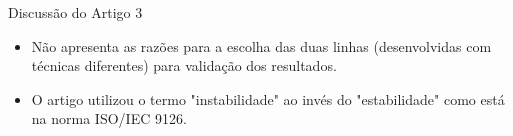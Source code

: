 \begin{frame}{Discussão do Artigo 3}
    \begin{itemize}
      \item Não apresenta as razões para a escolha das  \alert{duas linhas} (desenvolvidas com técnicas diferentes) para \alert{validação dos resultados}.
      \item O artigo utilizou o termo \alert{"instabilidade"} ao invés do \alert{"estabilidade"} como está na norma \alert{ISO/IEC 9126}.      
    \end{itemize}
\end{frame}
